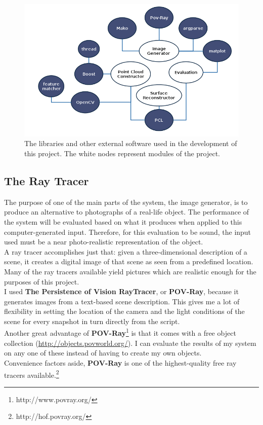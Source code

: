\documentclass[12pt,a4paper,twoside,openright]{report}
\begin{document}
\begin{figure}
\centerline{\includegraphics[scale=0.8]{figs/libraries.png}}
\caption{The libraries and other external software used in the development of this project. The white nodes represent modules of the project.}
\end{figure}
\subsection{The Ray Tracer} 
The purpose of one of the main parts of the system, the image generator, is to produce an alternative to photographs of a real-life object. The performance of the system will be evaluated based on what it produces when applied to this computer-generated input. Therefore, for this evaluation to be sound, the input used must be a near photo-realistic representation of the object.\\  
\linebreak
A ray tracer accomplishes just that: given a three-dimensional description of a scene, it creates a digital image of that scene as seen from a predefined location. Many of the ray tracers available yield pictures which are realistic enough for the purposes of this project. \\   
I used \textbf{The Persistence of Vision RayTracer}, or \textbf{POV-Ray}, because it generates images from a text-based scene description. This gives me a lot of flexibility in setting the location of the camera and the light conditions of the scene for every snapshot in turn directly from the script.\\
Another great advantage of \textbf{POV-Ray}\footnote{http://www.povray.org/} is that it comes with a free object collection (\url{http://objects.povworld.org/}). I can evaluate the results of my system on any one of these instead of having to create my own objects.\\
Convenience factors aside, \textbf{POV-Ray} is one of the highest-quality free ray tracers available.\footnote{http://hof.povray.org/}
\end{document}
